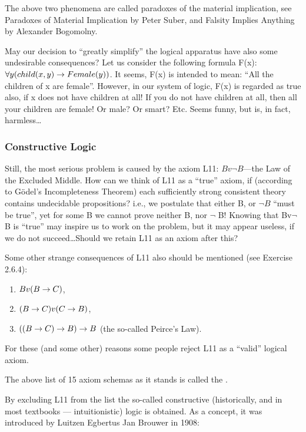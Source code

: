 The above two phenomena are called paradoxes of the material implication, see Paradoxes of Material Implication by Peter Suber, and Falsity Implies Anything by Alexander Bogomolny.

May our decision to ``greatly simplify'' the logical apparatus have also some undesirable consequences?  Let us consider the following formula F(x): \(\forall y(child(x, y)\rightarrow Female(y))\).  It seems, F(x) is intended to mean: ``All the children of x are female''. However, in our system of logic, F(x) is regarded as true also, if x does not have children at all! If you do not have children at all, then all your children are female! Or male? Or smart? Etc. Seems funny, but is, in fact, harmless\ldots 

\subsubsection{Constructive Logic}

Still, the most serious problem is caused by the axiom L11: \(Bv\neg B\)---the Law of the Excluded Middle.  How can we think of L11 as a ``true'' axiom, if (according to G\"{o}del's Incompleteness Theorem) each sufficiently strong consistent theory contains undecidable propositions? i.e., we postulate that either B, or \(\neg B\) ``must be true'', yet for some B we cannot prove neither B, nor \(\neg\) B! Knowing that Bv\(\neg\) B is ``true'' may inspire us to work on the problem, but it may appear useless, if we do not succeed\ldots  Should we retain L11 as an axiom after this?

Some other strange consequences of L11 also should be mentioned (see Exercise 2.6.4):

\begin{enumerate}
    \item \(Bv(B\rightarrow C)\),
    \item \((B\rightarrow C)v(C\rightarrow B)\),
    \item \(((B\rightarrow C)\rightarrow B)\rightarrow B\) (the so-called Peirce's Law).
\end{enumerate}

For these (and some other) reasons some people reject L11 as a ``valid'' logical axiom.

The above list of 15 axiom schemas as it stands is called the .

By excluding L11 from the list the so-called constructive (historically, and in most textbooks --- intuitionistic) logic is obtained. As a concept, it was introduced by Luitzen Egbertus Jan Brouwer in 1908:

